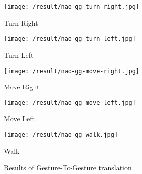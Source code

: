 \begin{figure}
	[h]	 	
	\begin{minipage}
		{.3 
			\textwidth}  		
		\texttt{[image: /result/nao-gg-turn-right.jpg]} \caption*{Turn Right } 
	\end{minipage}
	\begin{minipage}
		{.3 
			\textwidth}  
		
		\texttt{[image: /result/nao-gg-turn-left.jpg]} \caption*{Turn Left }
	\end{minipage}
	\begin{minipage}
		{.3
			\textwidth}  
		
		\texttt{[image: /result/nao-gg-move-right.jpg]} \caption*{Move Right}
	\end{minipage}
	\begin{minipage}
		{.3
			\textwidth}  
		
		\texttt{[image: /result/nao-gg-move-left.jpg]} \caption*{Move Left}
	\end{minipage}
	\begin{minipage}
		{.4
			\textwidth}  
		\centering
		\texttt{[image: /result/nao-gg-walk.jpg]} 
		\caption*{Walk}
	\end{minipage}	
	\caption{Results of Gesture-To-Gesture translation}
	\label{res:gg}
\end{figure}
